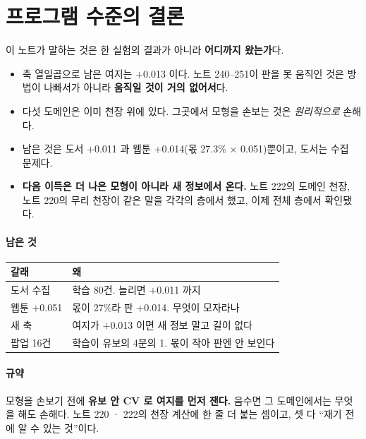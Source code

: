 \documentclass[10pt]{article}
\begin{document}
\section{프로그램 수준의 결론}

이 노트가 말하는 것은 한 실험의 결과가 아니라 \textbf{어디까지 왔는가}다.

\begin{itemize}
\item 축 열일곱으로 남은 여지는 $+$0.013 이다. 노트 240--251이 판을 못
움직인 것은 방법이 나빠서가 아니라 \textbf{움직일 것이 거의 없어서}다.
\item 다섯 도메인은 이미 천장 위에 있다. 그곳에서 모형을 손보는 것은
\emph{원리적으로} 손해다.
\item 남은 것은 도서 $+$0.011 과 웹툰 $+$0.014(몫 27.3\% $\times$ 0.051)뿐이고,
도서는 수집 문제다.
\item \textbf{다음 이득은 더 나은 모형이 아니라 새 정보에서 온다.} 노트 222의
도메인 천장, 노트 220의 무리 천장이 같은 말을 각각의 층에서 했고, 이제
전체 층에서 확인됐다.
\end{itemize}

\paragraph{남은 것}
\begin{center}\small
\begin{tabular}{ll}
\hline
갈래 & 왜 \\
\hline
도서 수집 & 학습 80건. 늘리면 $+$0.011 까지 \\
웹툰 $+$0.051 & 몫이 27\%라 판 $+$0.014. 무엇이 모자라나 \\
새 축 & 여지가 $+$0.013 이면 새 정보 말고 길이 없다 \\
팝업 16건 & 학습이 유보의 4분의 1. 몫이 작아 판엔 안 보인다 \\
\hline
\end{tabular}
\end{center}

\paragraph{규약} 모형을 손보기 전에 \textbf{유보 안 CV 로 여지를 먼저 잰다.}
음수면 그 도메인에서는 무엇을 해도 손해다. 노트 220 · 222의 천장 계산에
한 줄 더 붙는 셈이고, 셋 다 ``재기 전에 알 수 있는 것''이다.
\end{document}
